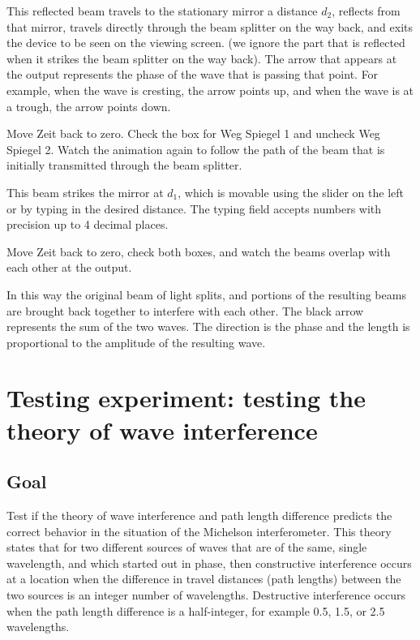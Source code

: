 This reflected beam travels to the stationary mirror a distance $d_2$, reflects from that mirror, travels directly through the beam splitter on the way back, and exits the device to be seen on the viewing screen. (we ignore the part that is reflected when it strikes the beam splitter on the way back). The arrow that appears at the output represents the phase of the wave that is passing that point. For example, when the wave is cresting, the arrow points up, and when the wave is at a trough, the arrow points down.

\begin{steps}
	\item Move Zeit back to zero. Check the box for Weg Spiegel 1 and uncheck Weg Spiegel 2. Watch the animation again to follow the path of the beam that is initially transmitted through the beam splitter.
\end{steps}

This beam strikes the mirror at $d_1$, which is movable using the slider on the left or by typing in the desired distance. The typing field accepts numbers with precision up to 4 decimal places.

\begin{steps}
	\item Move Zeit back to zero, check both boxes, and watch the beams overlap with each other at the output.
\end{steps}

In this way the original beam of light splits, and portions of the resulting beams are brought back together to interfere with each other. The black arrow represents the sum of the two waves. The direction is the phase and the length is proportional to the amplitude of the resulting wave.

\section{Testing experiment: testing the theory of wave interference}

\subsection{Goal}

Test if the theory of wave interference and path length difference predicts the correct behavior in the situation of the Michelson interferometer. This theory states that for two different sources of waves that are of the same, single wavelength, and which started out in phase, then constructive interference occurs at a location when the difference in travel distances (path lengths) between the two sources is an integer number of wavelengths. Destructive interference occurs when the path length difference is a half-integer, for example 0.5, 1.5, or 2.5 wavelengths.

